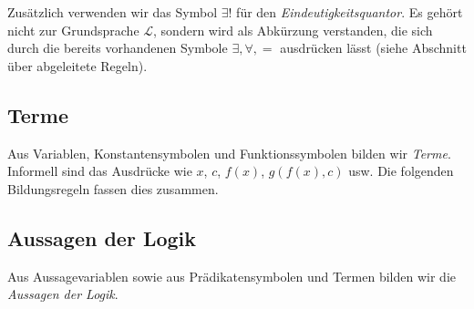 \documentclass[main.tex]{subfiles}
\begin{document}
Zusätzlich verwenden wir das Symbol \(\exists!\) für den
\emph{Eindeutigkeitsquantor}. Es gehört nicht zur Grundsprache
\(\mathcal L\), sondern wird als Abkürzung verstanden, die sich
durch die bereits vorhandenen Symbole \(\exists,\forall,=\) ausdrücken
lässt (siehe Abschnitt über abgeleitete Regeln).

\subsection{Terme}

Aus Variablen, Konstantensymbolen und Funktionssymbolen bilden wir
\emph{Terme}. Informell sind das Ausdrücke wie
\(x\), \(c\), \(f(x)\), \(g(f(x),c)\) usw. Die folgenden
Bildungsregeln fassen dies zusammen.


\subsection{Aussagen der Logik}

Aus Aussagevariablen sowie aus Prädikatensymbolen und Termen
bilden wir die \emph{Aussagen der Logik}.
\end{document}

